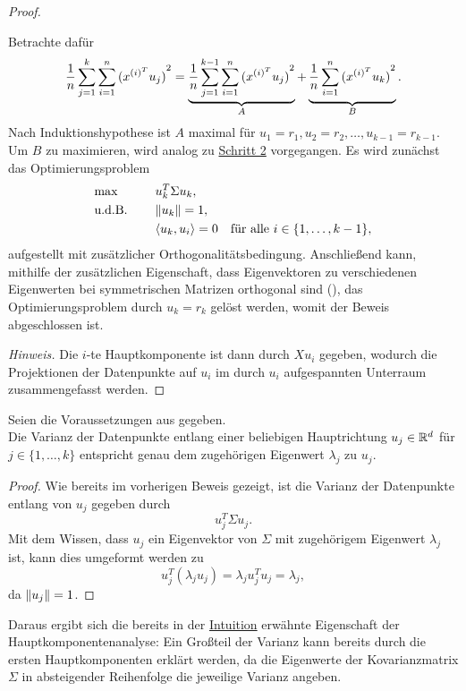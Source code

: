\begin{proof}
\begin{enumerate}[wide,label=\underline{Schritt \arabic*}.]
    Betrachte dafür
    \begin{equation*}
        \frac{1}{n}\sum_{j=1}^{k}\sum_{i=1}^{n}{(x^{{(i)}^{T}}u_{j})}^{2} = \underbrace{\frac{1}{n}\sum_{j=1}^{k-1}\sum_{i=1}^{n}{(x^{{(i)}^{T}}u_{j})}^{2}}_{A} + \underbrace{\vphantom{\sum_{j=1}}\frac{1}{n}\sum_{i=1}^{n}{(x^{{(i)}^{T}}u_{k})}^{2}}_{B}.
    \end{equation*}
    Nach Induktionshypothese ist \(A\) maximal für \(u_{1}=r_{1},u_{2}=r_{2},\ldots,u_{k-1}=r_{k-1}\). 
    Um \(B\) zu maximieren, wird analog zu \hyperref[itm:pca2]{Schritt 2} vorgegangen.
    Es wird zunächst das Optimierungsproblem
    \begin{alignat*}{2}
        &\!\max \qquad &&u_{k}^{T} \Sigma u_{k}, \\
        &\text{u.d.B.}  &&\lVert u_{k}\rVert=1, \\   
        &&& \langle u_{k},u_{i} \rangle = 0 \quad \text{für alle } i \in \{1,\ldots,k-1\},    
    \end{alignat*}
    aufgestellt mit zusätzlicher Orthogonalitätsbedingung.
    Anschließend kann, mithilfe der zusätzlichen Eigenschaft, dass Eigenvektoren zu verschiedenen Eigenwerten bei symmetrischen Matrizen orthogonal sind (), das Optimierungsproblem durch \(u_{k} = r_{k}\) gelöst werden, womit der Beweis abgeschlossen ist.
\end{enumerate}
\emph{Hinweis.} Die \(i\)-te Hauptkomponente ist dann durch \(Xu_{i}\) gegeben, wodurch die Projektionen der Datenpunkte auf \(u_{i}\) im durch \(u_{i}\) aufgespannten Unterraum zusammengefasst werden.    
\end{proof}
\begin{corollary}
    Seien die Voraussetzungen aus  gegeben. \\
    Die Varianz der Datenpunkte entlang einer beliebigen Hauptrichtung \(u_{j} \in \mathbb{R}^{d}\) für \(j \in \{1,\ldots,k\}\) entspricht genau dem zugehörigen Eigenwert \(\lambda_{j}\)  zu \(u_{j}\).    
\end{corollary}
\begin{proof}
    Wie bereits im vorherigen Beweis gezeigt, ist die Varianz der Datenpunkte entlang von \(u_{j}\) gegeben durch
    \begin{equation*}
        u_{j}^{T}\Sigma u_{j}.
    \end{equation*}
    Mit dem Wissen, dass \(u_{j}\) ein Eigenvektor von \(\Sigma\) mit zugehörigem Eigenwert \(\lambda_{j}\) ist, kann dies umgeformt werden zu
    \begin{equation*}
        u_{j}^{T}(\lambda_{j}u_{j}) = \lambda_{j}u_{j}^{T}u_{j} = \lambda_{j},
    \end{equation*}   
    da \(\lVert u_{j}\rVert=1\). 
\end{proof}
\begin{remark}
    Daraus ergibt sich die bereits in der \hyperref[sec:pcaint]{Intuition} erwähnte Eigenschaft der Hauptkomponentenanalyse:
    Ein Großteil der Varianz kann bereits durch die ersten Hauptkomponenten erklärt werden, da die Eigenwerte der Kovarianzmatrix \(\Sigma\) in absteigender Reihenfolge die jeweilige Varianz angeben.
\end{remark}

